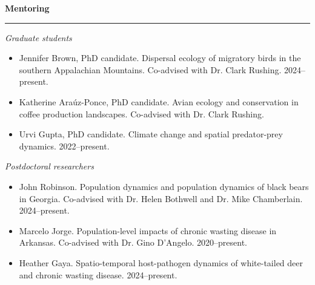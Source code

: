 \documentclass[12pt]{article}
\begin{document}



\vspace{0.5cm}

{\large \bf Mentoring} \\
\rule[3mm]{\textwidth}{0.3mm}

{\it Graduate students}
\begin{itemize}
  \item Jennifer Brown, PhD candidate. Dispersal ecology of migratory
    birds in the southern Appalachian Mountains. Co-advised with
    Dr. Clark Rushing. 2024--present.
  \item Katherine Ara\'uz-Ponce, PhD candidate. Avian ecology and
    conservation in coffee production landscapes. Co-advised with
    Dr. Clark Rushing.
  \item Urvi Gupta, PhD candidate. Climate change and spatial
    predator-prey dynamics. 2022--present. 
\end{itemize}

{\it Postdoctoral researchers}
\begin{itemize}
   \item John Robinson. Population dynamics and population dynamics of
     black bears in Georgia. Co-advised with Dr. Helen Bothwell and
     Dr. Mike Chamberlain. 2024--present.  
   \item Marcelo Jorge. Population-level impacts of
      chronic wasting disease in Arkansas. Co-advised with Dr. Gino
      D'Angelo. 2020--present.
   \item Heather Gaya. Spatio-temporal host-pathogen dynamics of
     white-tailed deer and chronic wasting disease. 2024--present. 
\end{itemize}

\end{document}
